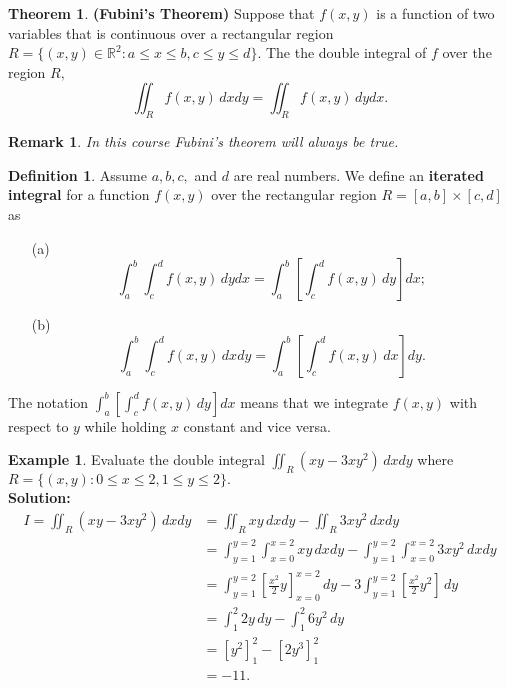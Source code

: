 \documentclass[12pt, a4paper]{article}
\newcommand{\bb}[1]{\mathbb{#1}}
\newtheorem*{remark}{Remark}
\theoremstyle{definition}
\newtheorem{definition}{Definition}[section]
\newtheorem{theorem}{Theorem}[section]
\newtheorem*{example}{Example}
\theoremstyle{plain}
\begin{document}
\begin{theorem} \textbf{(Fubini's Theorem)}
Suppose that $f(x,y)$ is a function of two variables that is continuous over a rectangular region $R=\{(x,y) \in \bb{R}^2 : a \leq x \leq b,c\leq y\leq d\}.$ The the double integral of $f$ over the region $R,$ $$\iint_R f(x,y) \, dxdy =\iint_R f(x,y) \, dydx.$$
\end{theorem}	

\begin{remark}
In this course Fubini's theorem will always be true.
\end{remark}

\begin{definition}
Assume $a, b, c,$ and $d$ are real numbers. We define an \textbf{iterated integral} for a function $f (x, y)$ over the rectangular region $R=[a,b]\times [c,d]$ as \begin{enumerate}
	
	\item[(a)] $$\int_a^b\int_c^d f(x,y) \, dydx = \int_a^b\left[\int_c^d f(x,y) \, dy\right]dx;$$

	\item[(b)] $$\int_a^b\int_c^d f(x,y) \, dxdy = \int_a^b\left[\int_c^d f(x,y) \, dx\right]dy.$$

\end{enumerate}

The notation $\int_a^b\left[\int_c^d f(x,y) \, dy\right]dx$ means that we integrate $f(x,y)$ with respect to $y$ while holding $x$ constant and vice versa.

\end{definition}

\begin{example}
Evaluate the double integral $\iint_R (xy-3xy^2) \,dxdy$ where $R=\{(x,y) : 0 \leq x \leq 2, 1\leq y \leq 2\}.$ \\
\textbf{Solution:} $$\begin{aligned}
I=\iint_R (xy-3xy^2) \,dxdy &= \iint_R xy \, dxdy - \iint_R 3xy^2\, dxdy \\
&= \int_{y=1}^{y=2} \int_{x=0}^{x=2} xy \, dxdy - \int_{y=1}^{y=2} \int_{x=0}^{x=2} 3xy^2 \, dxdy \\
&= \int_{y=1}^{y=2} \left[\frac{x^2}{2}y\right]_{x=0}^{x=2} \, dy - 3\int_{y=1}^{y=2} \left[\frac{x^2}{2}y^2\right] \, dy \\
&= \int_1^2 2y \, dy - \int_1^2 6y^2 \, dy \\
&= [y^2]_1^2 - [2y^3]_1^2\\
&= -11.
\end{aligned}$$
\end{example}
\end{document}
